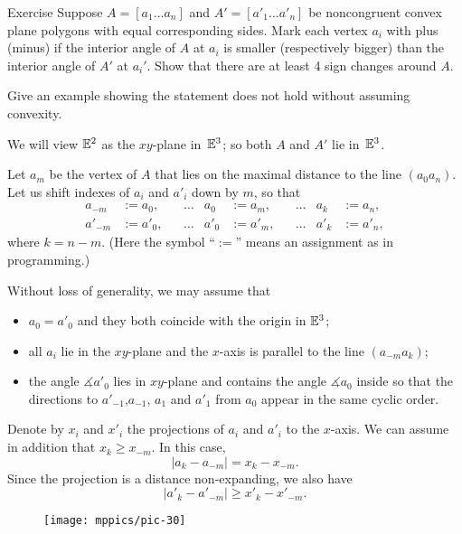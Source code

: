 \begin{thm}{Exercise}\label{ex:cauchy}
Suppose $A=[a_1\dots a_n]$ and $A'=[a'_1\dots a'_n]$ be noncongruent convex plane polygons with equal corresponding sides.
Mark each vertex $a_i$ with plus (minus) if the interior angle of $A$ at $a_i$ is smaller (respectively bigger) than the interior angle of $A'$ at $a_i'$.
Show that there are at least 4 sign changes around $A$. %

Give an example showing the statement does not hold without assuming convexity.

\end{thm}

We will view $\mathbb{E}^2$ as the $xy$-plane in~$\mathbb{E}^3$; 
so both $A$ and $A'$ lie in~$\mathbb{E}^3$.

Let $a_m$ be the vertex of $A$ that lies on the maximal distance to the line $(a_0a_n)$.
Let us shift indexes of $a_i$ and $a'_i$ down by $m$,
so that 
\begin{align*}
a_{-m}&:=a_0,
&&\dots
&
a_{0}&:=a_m,
&&\dots
&
a_k&:=a_n,
\\
a'_{-m}&:=a'_0,
&&\dots
&
a'_{0}&:=a'_m,
&&\dots
&
a'_k&:=a'_n,
\end{align*}
where $k=n-m$.
(Here the symbol ``$:=$'' means an assignment as in programming.)

Without loss of generality, we may assume that
\begin{itemize}
\item $a_0=a'_0$ and they both coincide with the origin in $\mathbb{E}^3$;
\item all $a_i$ lie in the $xy$-plane and the $x$-axis is parallel to the line $(a_{-m}a_k)$;
\item the angle $\measuredangle a'_0$ lies in $xy$-plane and contains the angle $\measuredangle a_0$ inside so that the directions to $a'_{-1}$,$a_{-1}$, $a_{1}$ and $a'_{1}$ from $a_0$ appear in the same cyclic order.
\end{itemize}

Denote by $x_i$ and $x'_i$ the projections of $a_i$ and $a'_i$ to the $x$-axis.
We can assume in addition that $x_k\ge x_{-m}$.
In this case,
$$|a_k-a_{-m}|=x_k-x_{-m}.$$
Since the projection is a distance non-expanding, we also have
$$|a'_k-a'_{-m}|\ge x'_k-x'_{-m}.$$ 

\begin{wrapfigure}{r}{60mm}
\vskip-5mm
\centering
\texttt{[image: mppics/pic-30]}
\vskip3mm
\end{wrapfigure}

